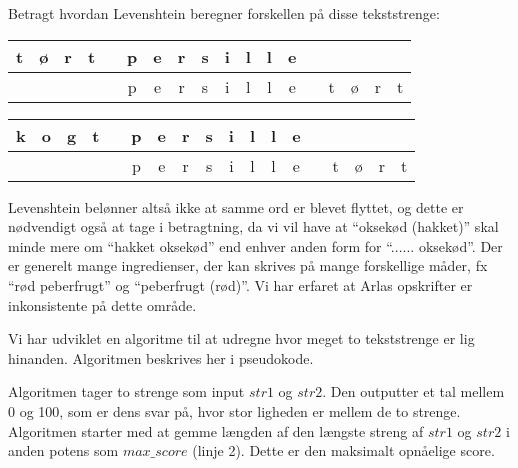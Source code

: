 Betragt hvordan Levenshtein beregner forskellen på disse tekststrenge:

\begin{table}[H]
\centering
\begin{tabular}{c c c c c c c c c c c c c c c c c c }
t & ø & r & t &  & p & e & r & s & i & l & l & e & & & & & \\ \hline
 &  &  &  &  & p & e & r & s & i & l & l & e & & t & ø & r & t \\ 
\end{tabular}
\label{table:levenshtein1}
\end{table}

\begin{table}[H]
\centering
\begin{tabular}{c c c c c c c c c c c c c c c c c c  }
k & o & g & t &  & p & e & r & s & i & l & l & e &  &   &   &   & \\ \hline
 &  &  &   &  & p & e & r & s & i & l & l & e &  & t & ø & r & t \\
\end{tabular}
\label{table:levenshtein2}
\end{table}

Levenshtein belønner altså ikke at samme ord er blevet flyttet, og dette er nødvendigt også at tage i betragtning, da vi vil have at ``oksekød (hakket)'' skal minde mere om ``hakket oksekød'' end enhver anden form for ``...... oksekød''. Der er generelt mange ingredienser, der kan skrives på mange forskellige måder, fx ``rød peberfrugt'' og ``peberfrugt (rød)''. Vi har erfaret at Arlas opskrifter er inkonsistente på dette område.

Vi har udviklet en algoritme til at udregne hvor meget to tekststrenge er lig hinanden. Algoritmen beskrives her i pseudokode.

\begin{algorithm} [H]
	\label{pseudo:parsing}
	
\end{algorithm}

Algoritmen tager to strenge som input $str1$ og $str2$. Den outputter et tal mellem 0 og 100, som er dens svar på, hvor stor ligheden er mellem de to strenge. Algoritmen starter med at gemme længden af den længste streng af $str1$ og $str2$ i anden potens som $max\_score$ (linje 2). Dette er den maksimalt opnåelige score.

